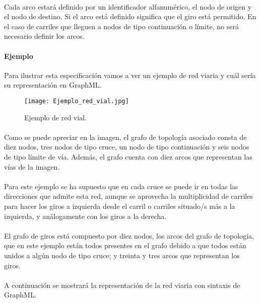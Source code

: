 	\paragraph{}
	Cada arco estará definido por un identificador alfanumérico, el nodo de origen y el nodo de destino. Si el arco está definido significa que el giro está permitido. En el caso de carriles que lleguen a nodos de tipo continuación o límite, no será necesario definir los arcos.
	
	\paragraph{Ejemplo}
	Para ilustrar esta especificación vamos a ver un ejemplo de red viaria y cuál sería su representación en GraphML.
	
	\begin{figure}[H]
		\centering
			\texttt{[image: Ejemplo\_red\_vial.jpg]}
	\caption{Ejemplo de red vial.}
	\label{fig:RoadNetworkSchematic}
	\end{figure}
	
	\paragraph{}
	Como se puede apreciar en la imagen, el grafo de topología asociado consta de diez nodos, tres nodos de tipo cruce, un nodo de tipo continuación y seis nodos de tipo límite de vía. Además, el grafo cuenta con diez arcos que representan las vías de la imagen.
	
	\paragraph{}
	Para este ejemplo se ha supuesto que en cada cruce se puede ir en todas las direcciones que admite esta red, aunque se aprovecha la multiplicidad de carriles para hacer los giros a izquierda desde el carril o carriles situado/s más a la izquierda, y análogamente con los giros a la derecha.
	
	\paragraph{}
	El grafo de giros está compuesto por diez nodos, los arcos del grafo de topología, que en este ejemplo están todos presentes en el grafo debido a que todos están unidos a algún nodo de tipo cruce; y treinta y tres arcos que representan los giros.
	
	\paragraph{}
	A continuación se mostrará la representación de la red viaria con sintaxis de GraphML.
	
